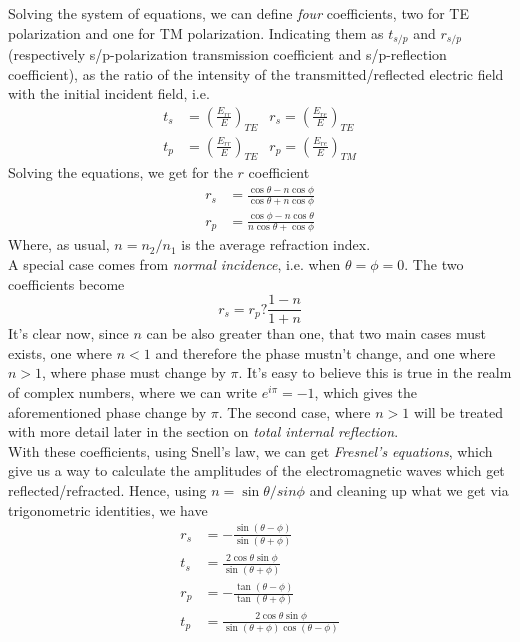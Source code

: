 \documentclass[../electromagnetism.tex]{subfiles}
\begin{document}
Solving the system of equations, we can define \textit{four} coefficients, two for TE polarization and one for TM polarization. Indicating them as $t_{s/p}$ and $r_{s/p}$ (respectively s/p-polarization transmission coefficient and s/p-reflection coefficient), as the ratio of the intensity of the transmitted/reflected electric field with the initial incident field, i.e.
\begin{equation}
	\begin{aligned}
		t_s&=\left( \frac{E_{rr}}{E} \right)_{TE}&r_s=\left( \frac{E_{re}}{E} \right)_{TE}\\
		t_p&= \left( \frac{E_{rr}}{E} \right)_{TE}&r_p=\left( \frac{E_{re}}{E} \right)_{TM}
	\end{aligned}
	\label{eq:rtfirstdef}
\end{equation}
Solving the equations, we get for the $r$ coefficient
\begin{equation}
	\begin{aligned}
		r_s&= \frac{\cos\theta-n\cos\phi}{\cos\theta+n\cos\phi}\\
		r_p&= \frac{\cos\phi-n\cos\theta}{n\cos\theta+\cos\phi}
	\end{aligned}
	\label{eq:rsrpgeneral}
\end{equation}
Where, as usual, $n=n_2/n_1$ is the average refraction index.\\
A special case comes from \emph{normal incidence}, i.e. when $\theta=\phi=0$. The two coefficients become
\begin{equation}
	r_s=r_p?\frac{1-n}{1+n}
	\label{eq:normalincidencersrp}
\end{equation}
It's clear now, since $n$ can be also greater than one, that two main cases must exists, one where $n<1$ and therefore the phase mustn't change, and one where $n>1$, where phase must change by $\pi$. It's easy to believe this is true in the realm of complex numbers, where we can write $e^{i\pi}=-1$, which gives the aforementioned phase change by $\pi$. The second case, where $n>1$ will be treated with more detail later in the section on \textit{total internal reflection}.\\
With these coefficients, using Snell's law, we can get \textit{Fresnel's equations}, which give us a way to calculate the amplitudes of the electromagnetic waves which get reflected/refracted. Hence, using $n=\sin\theta/sin\phi$ and cleaning up what we get via trigonometric identities, we have
\begin{equation}
	\begin{aligned}
		r_s&= -\frac{\sin(\theta-\phi)}{\sin(\theta+\phi)}\\
		t_s&= \frac{2\cos\theta\sin\phi}{\sin(\theta+\phi)}\\
		r_p&= -\frac{\tan(\theta-\phi)}{\tan(\theta+\phi)}\\
		t_p&= \frac{2\cos\theta\sin\phi}{\sin(\theta+\phi)\cos(\theta-\phi)}
	\end{aligned}
	\label{eq:fresneleqs}
\end{equation}
\end{document}
